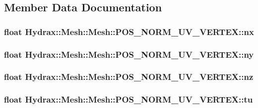 \subsection{Member Data Documentation}
\hypertarget{struct_hydrax_1_1_mesh_1_1_p_o_s___n_o_r_m___u_v___v_e_r_t_e_x_6000dc953245d0f42fa74da4b93887aa}{
\subsubsection[{nx}]{\setlength{\rightskip}{0pt plus 5cm}float Hydrax::Mesh::Mesh::POS\_\-NORM\_\-UV\_\-VERTEX::nx}}
\label{struct_hydrax_1_1_mesh_1_1_p_o_s___n_o_r_m___u_v___v_e_r_t_e_x_6000dc953245d0f42fa74da4b93887aa}


\hypertarget{struct_hydrax_1_1_mesh_1_1_p_o_s___n_o_r_m___u_v___v_e_r_t_e_x_43746202bf4ed8a4e552c02dbf294001}{
\subsubsection[{ny}]{\setlength{\rightskip}{0pt plus 5cm}float Hydrax::Mesh::Mesh::POS\_\-NORM\_\-UV\_\-VERTEX::ny}}
\label{struct_hydrax_1_1_mesh_1_1_p_o_s___n_o_r_m___u_v___v_e_r_t_e_x_43746202bf4ed8a4e552c02dbf294001}


\hypertarget{struct_hydrax_1_1_mesh_1_1_p_o_s___n_o_r_m___u_v___v_e_r_t_e_x_e74cd37e00d1d1785b413f3ed37bef03}{
\subsubsection[{nz}]{\setlength{\rightskip}{0pt plus 5cm}float Hydrax::Mesh::Mesh::POS\_\-NORM\_\-UV\_\-VERTEX::nz}}
\label{struct_hydrax_1_1_mesh_1_1_p_o_s___n_o_r_m___u_v___v_e_r_t_e_x_e74cd37e00d1d1785b413f3ed37bef03}


\hypertarget{struct_hydrax_1_1_mesh_1_1_p_o_s___n_o_r_m___u_v___v_e_r_t_e_x_3ab8e346c7ab8c49f43f339aa8a6b3d3}{
\subsubsection[{tu}]{\setlength{\rightskip}{0pt plus 5cm}float Hydrax::Mesh::Mesh::POS\_\-NORM\_\-UV\_\-VERTEX::tu}}
\label{struct_hydrax_1_1_mesh_1_1_p_o_s___n_o_r_m___u_v___v_e_r_t_e_x_3ab8e346c7ab8c49f43f339aa8a6b3d3}


